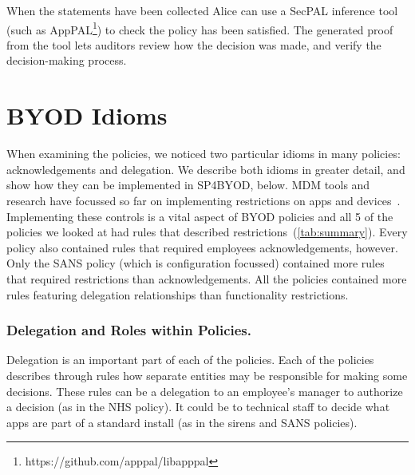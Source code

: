 \documentclass{llncs}
\newcommand{\AppPAL}[0]{SP4BYOD}
\begin{document}
When the statements have been collected 
  Alice can use a SecPAL inference tool (such as AppPAL\footnote{https://github.com/apppal/libapppal}) to check the policy has been satisfied.
The generated proof from the tool lets auditors review how the decision was made, and verify the decision-making process.


\section{BYOD Idioms}
\label{sec:idioms}

When examining the policies, we noticed two particular idioms in many policies: acknowledgements and delegation.
We describe both idioms in greater detail, and show how they can be implemented in \AppPAL{}, below.
MDM tools and research have focussed so far on implementing restrictions on apps and devices~\cite{_ibm_????,armando_formal_2014,martinelli_enhancing_2016}.
Implementing these controls is a vital aspect of BYOD policies and all 5 of the policies we looked at had rules that described restrictions~(\autoref{tab:summary}).
Every policy also contained rules that required employees acknowledgements, however.
Only the SANS policy (which is configuration focussed) contained more rules that required restrictions than acknowledgements. 
All the policies contained more rules featuring delegation relationships than functionality restrictions.

\subsubsection{Delegation and Roles within Policies.}

Delegation is an important part of each of the policies.
Each of the policies describes through rules how separate entities may be responsible for making some decisions.
These rules can be a delegation to an employee's manager to authorize a decision (as in the NHS policy). 
It could be to technical staff to decide what apps are part of a standard install (as in the sirens and SANS policies).
\end{document}
